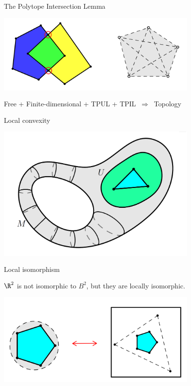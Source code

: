 \documentclass[12pt]{beamer}
\begin{document}
\begin{frame}{The Polytope Intersection Lemma}
    \centering

    \includegraphics[width = 10cm]{14.png}

    \begin{definition}
        Free + Finite-dimensional + TPUL + TPIL \(\ \Longrightarrow \ \) Topology
    \end{definition}
\end{frame}

\newpage

\begin{frame}{Local convexity}
    
    \centering

    \includegraphics[width = 10cm]{15.png}
\end{frame}

\newpage

\begin{frame}{Local isomorphism}
    \begin{lemma}
        \(\R^2\) is not isomorphic to \(B^2\), but they are locally isomorphic.
    \end{lemma}

    \centering

    \includegraphics[width = 10cm]{17.png}
\end{frame}
\end{document}
